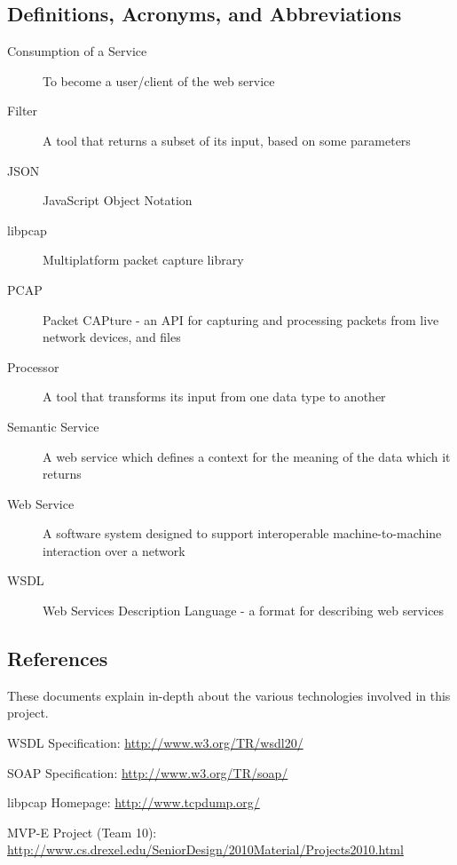 \documentclass[titlepage]{article}
\begin{document}
\subsection{Definitions, Acronyms, and Abbreviations%
  \label{definitions}%
}

\begin{description}
\item[Consumption of a Service]
    To become a user/client of the web service

\item[Filter]
    A tool that returns a subset of its input, based on some parameters

\item[JSON]
    JavaScript Object Notation

\item[libpcap]
    Multiplatform packet capture library

\item[PCAP]
    Packet CAPture - an API for capturing and processing packets from live
    network devices, and files

\item[Processor]
    A tool that transforms its input from one data type to another

\item[Semantic Service]
    A web service which defines a context for the meaning of the data which it
    returns

\item[Web Service]
    A software system designed to support interoperable machine-to-machine
    interaction over a network

\item[WSDL]
    Web Services Description Language - a format for describing web services
\end{description}


\subsection{References%
  \label{references}%
}

These documents explain in-depth about the various technologies involved in
this project.
%
\begin{itemize*}
\item WSDL Specification: \url{http://www.w3.org/TR/wsdl20/}
\item SOAP Specification: \url{http://www.w3.org/TR/soap/}
\item libpcap Homepage: \url{http://www.tcpdump.org/}
\item MVP-E Project (Team 10): \url{http://www.cs.drexel.edu/SeniorDesign/2010Material/Projects2010.html}
\end{itemize*}
\end{document}
